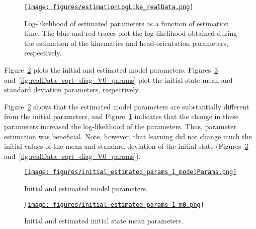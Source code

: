 \documentclass[12pt]{article}
\begin{document}
\begin{figure}
    \centering
    \href{https://www.gatsby.ucl.ac.uk/~rapela/aman/reports/ekfForKinematicsAndHeadOrientation/figures/estimationLogLike_realData.html}{\texttt{[image: figures/estimationLogLike\_realData.png]}}
    \caption{Log-likelihood of estimated parameters as a function of estimation
    time. The blue and red traces plot the log-likelihood obtained during the
    estimation of the kinematics and head-orientation parameters,
    respectively.}
    \label{fig:realData_logLike}
\end{figure}

Figure~\ref{fig:realData_model_params} plots the initial and estimated model
parameters. Figures~\ref{fig:realData_m0_params}
and~\ref{fig:realData_sqrt_diag_V0_params} plot the initial
state mean and standard deviation parameters, respectively.

Figure~\ref{fig:realData_model_params} shows that the estimated model
parameters are substantially different from the initial parameters, and
Figure~\ref{fig:realData_logLike} indicates that the change in these parameters
increased the log-likelihood of the parameters. Thus, parameter estimation was
beneficial.
%
Note, however, that learning did not change much the initial values of the
mean and standard deviation of the initial state
(Figures~\ref{fig:realData_m0_params}
and~\ref{fig:realData_sqrt_diag_V0_params}).

\begin{figure}
    \centering
    \href{https://www.gatsby.ucl.ac.uk/~rapela/aman/reports/ekfForKinematicsAndHeadOrientation/figures/initial_estimated_params_1_modelParams.html}{\texttt{[image: figures/initial\_estimated\_params\_1\_modelParams.png]}}

    \caption{Initial and estimated model parameters.}

    \label{fig:realData_model_params}
\end{figure}

\begin{figure}
    \centering
    \href{https://www.gatsby.ucl.ac.uk/~rapela/aman/reports/ekfForKinematicsAndHeadOrientation/figures/initial_estimated_params_1_m0.html}{\texttt{[image: figures/initial\_estimated\_params\_1\_m0.png]}}

    \caption{Initial and estimated initial state mean parameters.}

    \label{fig:realData_m0_params}
\end{figure}
\end{document}
